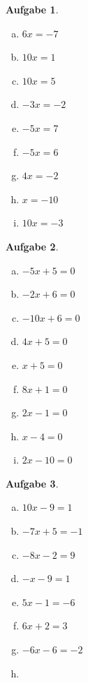 \documentclass[12pt,fleqn]{article}
\theoremstyle{aufg}
\newtheorem{aufgabe}{Aufgabe}
\theoremstyle{bsp}
\begin{document}
 
    \begin{flushleft}
\begin{aufgabe} ~ \\ 
\begin{multicols}{3} 
\begin{enumerate}[a)] 
\item 
$6 x = -7$
\item 
$10 x = 1$
\item 
$10 x = 5$
\item 
$- 3 x = -2$
\item 
$- 5 x = 7$
\item 
$- 5 x = 6$
\item 
$4 x = -2$
\item 
$x = -10$
\item 
$10 x = -3$
\end{enumerate} 
\end{multicols} 
\end{aufgabe} 
\begin{aufgabe} ~ \\ 
\begin{multicols}{3} 
\begin{enumerate}[a)] 
\item 
$- 5 x + 5 = 0$
\item 
$- 2 x + 6 = 0$
\item 
$- 10 x + 6 = 0$
\item 
$4 x + 5 = 0$
\item 
$x + 5 = 0$
\item 
$8 x + 1 = 0$
\item 
$2 x - 1 = 0$
\item 
$x - 4 = 0$
\item 
$2 x - 10 = 0$
\end{enumerate} 
\end{multicols} 
\end{aufgabe} 
\begin{aufgabe} ~ \\ 
\begin{multicols}{3} 
\begin{enumerate}[a)] 
\item 
$10 x - 9 = 1$
\item 
$- 7 x + 5 = -1$
\item 
$- 8 x - 2 = 9$
\item 
$- x - 9 = 1$
\item 
$5 x - 1 = -6$
\item 
$6 x + 2 = 3$
\item 
$- 6 x - 6 = -2$
\item 

\end{enumerate}
\end{multicols}
\end{aufgabe}
\end{flushleft}
\end{document}
